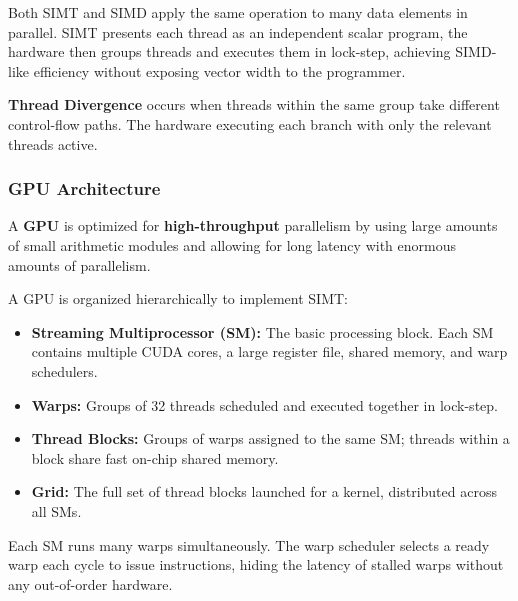 \begin{remark}
	Both SIMT and SIMD apply the same operation to many data elements in parallel. SIMT presents each thread as an independent scalar program, the hardware then groups threads and executes them in lock-step, achieving SIMD-like efficiency without exposing vector width to the programmer.
\end{remark}

\begin{definition}
	\textbf{Thread Divergence} occurs when threads within the same group take different control-flow paths. The hardware executing each branch with only the relevant threads active.
\end{definition}


\subsubsection{GPU Architecture}

\begin{definition}
	A \textbf{GPU} is optimized for \textbf{high-throughput} parallelism by using large amounts of small arithmetic modules and allowing for long latency with enormous amounts of parallelism.
\end{definition}

\begin{definition}
	A GPU is organized hierarchically to implement SIMT:
	\begin{itemize}
		\item \textbf{Streaming Multiprocessor (SM):} The basic processing block. Each SM contains multiple CUDA cores, a large register file, shared memory, and warp schedulers.
		\item \textbf{Warps:} Groups of 32 threads scheduled and executed together in lock-step.
		\item \textbf{Thread Blocks:} Groups of warps assigned to the same SM; threads within a block share fast on-chip shared memory.
		\item \textbf{Grid:} The full set of thread blocks launched for a kernel, distributed across all SMs.
	\end{itemize}
\end{definition}

\begin{remark}
	Each SM runs many warps simultaneously. The warp scheduler selects a ready warp each cycle to issue instructions, hiding the latency of stalled warps without any out-of-order hardware.
\end{remark}

